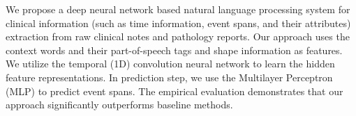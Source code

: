 We propose a deep neural network based natural language processing system for clinical information (such as time information, event spans, and their attributes) extraction from raw clinical notes and pathology reports. Our approach uses the context words and their part-of-speech tags and shape information as features. We utilize the temporal (1D) convolution neural network to learn the hidden feature representations. In prediction step, we use the Multilayer Perceptron (MLP) to predict event spans. The empirical evaluation demonstrates that our approach significantly outperforms baseline methods.
